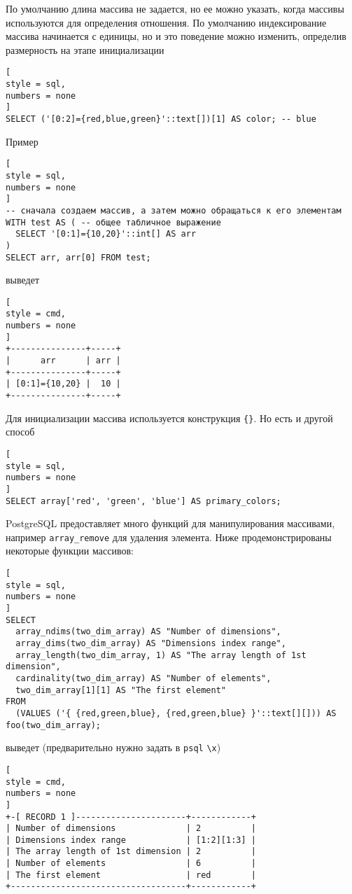 \documentclass[%
	11pt,
	a4paper,
	utf8,
		]{article}
\begin{document}
По умолчанию длина массива не задается, но ее можно указать, когда массивы используются для определения отношения. По умолчанию индексирование массива начинается с единицы, но и это поведение можно изменить, определив размерность на этапе инициализации
\begin{lstlisting}[
style = sql,
numbers = none
]
SELECT ('[0:2]={red,blue,green}'::text[])[1] AS color; -- blue
\end{lstlisting}

Пример
\begin{lstlisting}[
style = sql,
numbers = none
]
-- сначала создаем массив, а затем можно обращаться к его элементам
WITH test AS ( -- общее табличное выражение
  SELECT '[0:1]={10,20}'::int[] AS arr
)
SELECT arr, arr[0] FROM test;
\end{lstlisting}
выведет
\begin{lstlisting}[
style = cmd,
numbers = none
]
+---------------+-----+
|      arr      | arr |
+---------------+-----+
| [0:1]={10,20} |  10 |
+---------------+-----+
\end{lstlisting}

Для инициализации массива используется конструкция \verb|{}|. Но есть и другой способ
\begin{lstlisting}[
style = sql,
numbers = none
]
SELECT array['red', 'green', 'blue'] AS primary_colors;
\end{lstlisting}

PostgreSQL предоставляет много функций для манипулирования массивами, например \texttt{array\_remove} для удаления элемента. Ниже продемонстрированы некоторые функции массивов:
\begin{lstlisting}[
style = sql,
numbers = none
]
SELECT
  array_ndims(two_dim_array) AS "Number of dimensions",
  array_dims(two_dim_array) AS "Dimensions index range",
  array_length(two_dim_array, 1) AS "The array length of 1st dimension",
  cardinality(two_dim_array) AS "Number of elements",
  two_dim_array[1][1] AS "The first element"
FROM
  (VALUES ('{ {red,green,blue}, {red,green,blue} }'::text[][])) AS foo(two_dim_array);
\end{lstlisting}
выведет (предварительно нужно задать в \texttt{psql} \verb|\x|)
\begin{lstlisting}[
style = cmd,
numbers = none
]
+-[ RECORD 1 ]----------------------+------------+
| Number of dimensions              | 2          |
| Dimensions index range            | [1:2][1:3] |
| The array length of 1st dimension | 2          |
| Number of elements                | 6          |
| The first element                 | red        |
+-----------------------------------+------------+
\end{lstlisting}
\end{document}
